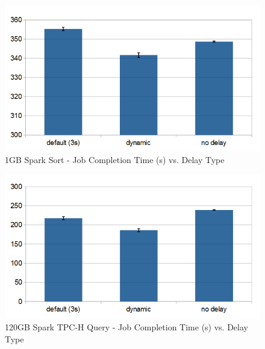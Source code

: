 \begin{figure}[t]
        \includegraphics[width=\linewidth]{./smallscale.png}
        \caption{1GB Spark Sort - Job Completion Time (s) vs. Delay Type}
        \label{fig:smallscale}
    \endminipage \hfill
\end{figure}

\begin{figure}[t]
        \includegraphics[width=\linewidth]{./largescale.png}
        \caption{120GB Spark TPC-H Query - Job Completion Time (s) vs. Delay Type}
        \label{fig:largescale}
    \endminipage \hfill
\end{figure}

